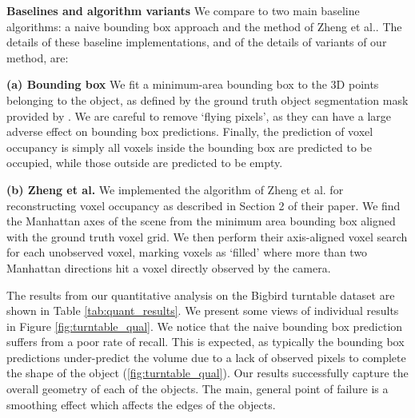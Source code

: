 \documentclass[10pt,twocolumn,letterpaper]{article}
\makeatletter
\newcommand*{\ea}{et al.\@\xspace}
\renewcommand{\paragraph}{\vspace{2pt}\noindent\textbf}
\makeatother
\begin{document}


\paragraph{Baselines and algorithm variants}
\label{sec:algorithms}
We compare to two main baseline algorithms: a naive bounding box approach and the method of Zheng \ea \cite{zheng-cvpr-2013}.
The details of these baseline implementations, and of the details of variants of our method, are:

\noindent \textbf{(a) Bounding box} We fit a minimum-area bounding box to the 3D points belonging to the object, as defined by the ground truth object segmentation mask provided by \cite{singh-icra-2014}.
We are careful to remove `flying pixels', as they can have a large adverse effect on bounding box predictions.
Finally, the prediction of voxel occupancy is simply all voxels inside the bounding box are predicted to be occupied, while those outside are predicted to be empty.

\noindent \textbf{(b) Zheng \ea} \cite{zheng-cvpr-2013}
We implemented the algorithm of Zheng \ea \cite{zheng-cvpr-2013} for reconstructing voxel occupancy as described in Section 2 of their paper.
We find the Manhattan axes of the scene from the minimum area bounding box aligned with the ground truth voxel grid.
We then perform their axis-aligned voxel search for each unobserved voxel, marking voxels as `filled' where more than two Manhattan directions hit a voxel directly observed by the camera.




The results from our quantitative analysis on the Bigbird turntable dataset are shown in Table \ref{tab:quant_results}.
We present some views of individual results in Figure \ref{fig:turntable_qual}.
We notice that the naive bounding box prediction suffers from a poor rate of recall.
This is expected, as typically the bounding box predictions under-predict the volume due to a lack of observed pixels to complete the shape of the object (\ref{fig:turntable_qual}).
Our results successfully capture the overall geometry of each of the objects.
The main, general point of failure is a smoothing effect which affects the edges of the objects.
\end{document}
